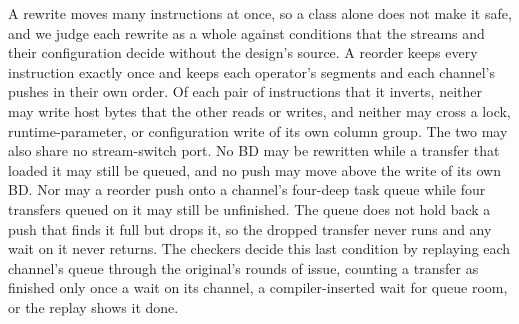 A rewrite moves many instructions at once, so a class alone does not make it safe, and we judge each rewrite as a whole against conditions that the streams and their configuration decide without the design's source.
A reorder keeps every instruction exactly once and keeps each operator's segments and each channel's pushes in their own order.
Of each pair of instructions that it inverts, neither may write host bytes that the other reads or writes, and neither may cross a lock, runtime-parameter, or configuration write of its own column group.
The two may also share no stream-switch port.
No BD may be rewritten while a transfer that loaded it may still be queued, and no push may move above the write of its own BD.
Nor may a reorder push onto a channel's four-deep task queue while four transfers queued on it may still be unfinished.
The queue does not hold back a push that finds it full but drops it, so the dropped transfer never runs and any wait on it never returns.
The checkers decide this last condition by replaying each channel's queue through the original's rounds of issue, counting a transfer as finished only once a wait on its channel, a compiler-inserted wait for queue room, or the replay shows it done.
